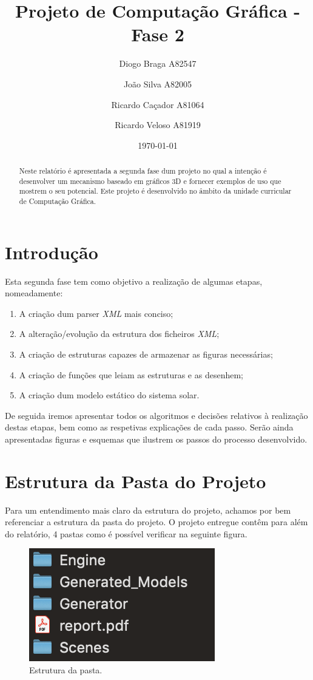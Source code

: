 \documentclass[a4paper]{article}
\title{Projeto de Computação Gráfica - Fase 2}
\author{Diogo Braga A82547 \and João Silva A82005 \and Ricardo Caçador A81064
\and Ricardo Veloso A81919}
\date{\today}
\begin{document}
\maketitle

\begin{abstract}
Neste relatório é apresentada a segunda fase dum projeto no qual a intenção é desenvolver um mecanismo baseado em gráficos 3D e fornecer exemplos de uso que mostrem o seu potencial. Este projeto é desenvolvido no âmbito da unidade curricular de Computação Gráfica.
\end{abstract}

\tableofcontents


\newpage

\section{Introdução}
\label{sec:intro}

Esta segunda fase tem como objetivo a realização de algumas etapas, nomeadamente:
\begin{enumerate}
\item A criação dum parser \emph{XML} mais conciso;
\item A alteração/evolução da estrutura dos ficheiros \emph{XML};
\item A criação de estruturas capazes de armazenar as figuras necessárias;
\item A criação de funções que leiam as estruturas e as desenhem;
\item A criação dum modelo estático do sistema solar.
\end{enumerate}

De seguida iremos apresentar todos os algoritmos e decisões relativos à realização destas etapas, bem como as respetivas explicações de cada passo.
Serão ainda apresentadas figuras e esquemas que ilustrem os passos do processo desenvolvido.



\section{Estrutura da Pasta do Projeto}
\label{sec:estrutura}

Para um entendimento mais claro da estrutura do projeto, achamos por bem referenciar a estrutura da pasta do projeto.
O projeto entregue contêm para além do relatório, 4 pastas como é possível verificar na seguinte figura.

\begin{figure}[H]
\centering
\includegraphics[scale=1.0]{estrutura.png}
\caption{Estrutura da pasta.}
\label{img:estrutura}
\end{figure}
\end{document}
